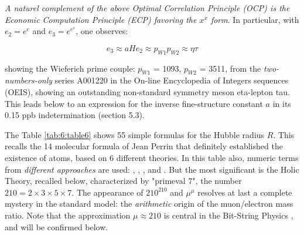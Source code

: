 \documentclass[a4paper,9pt]{article}
\begin{document}
\textit {A naturel complement of the above Optimal Correlation Principle (OCP) is the Economic Computation Principle (ECP) favoring the $x^x$ form}. In particular, with $e_2 = e^e$ and $e_3 = e^{e^e}$, one observes:

\begin{equation}\label{Eq2} 
e_3 \approx a H e_2 \approx p_{W1}p_{W2} \approx \eta \tau 
 \end{equation}

showing the Wieferich prime couple: $p_{W1}$ = 1093, $p_{W2}$ = 3511, from the \textit{two-numbers-only} series A001220 in the On-line Encyclopedia of Integers sequences (OEIS), showing an outstanding non-standard symmetry meson eta-lepton tau. This leads below to an expression for the inverse fine-structure constant $a$ in its 0.15 ppb indetermination (section 5.3).

The Table \ref{tab:6:table6} shows 55 simple formulas for the Hubble radius $R$. This recalls the 14 molecular formula of Jean Perrin that definitely established the existence of atoms, based on 6 different theories. In this table also, numeric terms from \textit{different approaches} are used:  \cite{Davies}, \cite{Rees}, \cite{Eddington}, \cite{Bastin} and \cite{Atiyah}. But the most significant is the Holic Theory, recalled below, characterized by "primeval 7", the number $210 = 2 \times 3\times 5\times7$. The appearance of $210^{210}$ and $\mu^{\mu}$ resolves at last a complete mystery in the standard model: the \textit{arithmetic} origin of the muon/electron mass ratio. Note that the approximation $\mu \approx 210$ is central in the Bit-String Physics \cite{Noyes}, and will be confirmed below.






\end{document}
